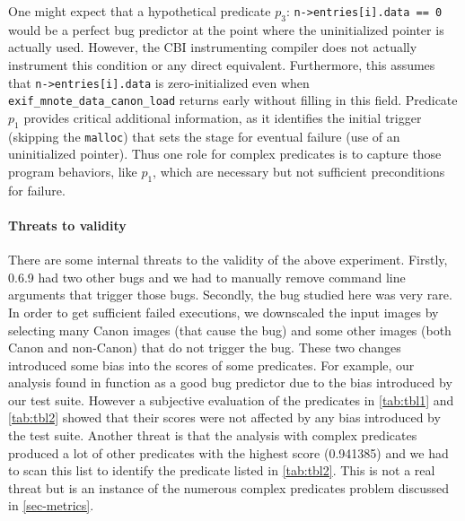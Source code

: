 One might expect that a hypothetical predicate $p_3$: \texttt{n->entries[i].data == 0} would be a perfect bug predictor at the point where the uninitialized pointer is actually used.  However, the CBI instrumenting compiler does not actually instrument this condition or any direct equivalent.  Furthermore, this assumes that \texttt{n->entries[i].data} is zero-initialized even when \texttt{exif\_mnote\_data\_canon\_load} returns early without filling in this field.  Predicate $p_1$ provides critical additional information, as it identifies the initial trigger (skipping the \texttt{malloc}) that sets the stage for eventual failure (use of an uninitialized pointer).  Thus one role for complex predicates is to capture those program behaviors, like $p_1$, which are necessary but not sufficient preconditions for failure.

\paragraph{Threats to validity}

There are some internal threats to the validity of the above experiment.  Firstly,  0.6.9 had two other bugs and we had to manually remove command line arguments that trigger those bugs.  Secondly, the bug studied here was very rare.  In order to get sufficient failed executions, we downscaled the input images by selecting many Canon images (that cause the bug) and some other images (both Canon and non-Canon) that do not trigger the bug.  These two changes introduced some bias into the scores of some predicates.  For example, our analysis found  in function  as a good bug predictor due to the bias introduced by our test suite.  However a subjective evaluation of the predicates in \autoref{tab:tbl1} and \autoref{tab:tbl2} showed that their scores were not affected by any bias introduced by the test suite.  Another threat is that the analysis with complex predicates produced a lot of other predicates with the highest score (0.941385) and we had to scan this list to identify the predicate listed in \autoref{tab:tbl2}.  This is not a real threat but is an instance of the numerous complex predicates problem discussed in \autoref{sec-metrics}.

